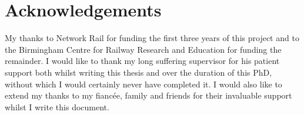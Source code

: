 



\bigskip

\begingroup
\let\clearpage\relax
\let\cleardoublepage\relax
\let\cleardoublepage\relax
\chapter*{Acknowledgements}
My thanks to Network Rail for funding the first three years of this project and to the Birmingham Centre for Railway Research and Education for funding the remainder.
I would like to thank my long suffering supervisor for his patient support both whilst writing this thesis and over the duration of this PhD, without which I would certainly never have completed it. 
I would also like to extend my thanks to my fiancée, family and friends for their invaluable support whilst I write this document.

\bigskip



\endgroup



